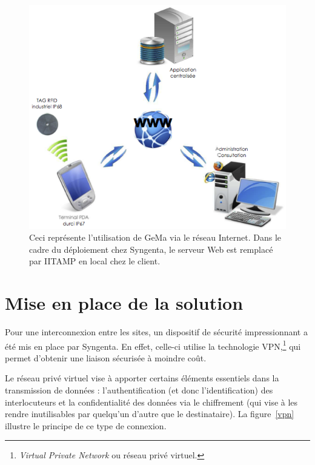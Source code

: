 \begin{figure}
  \begin{center}
    \includegraphics[scale=1.5]{images/gema.png}
    \caption{Ceci représente l'utilisation de GeMa via le réseau
    Internet. Dans le cadre du déploiement chez Syngenta, le serveur Web
    est remplacé par IITAMP en local chez le client.}
    \label{gema}
  \end{center}
\end{figure}

\section{Mise en place de la solution} %
\label{sec:Mise en place de la solution}

Pour une interconnexion entre les sites, un dispositif de sécurité
impressionnant a été mis en place par Syngenta. En effet, celle-ci
utilise la technologie VPN,\footnote{\emph{Virtual Private Network} ou
réseau privé virtuel.} qui permet d'obtenir une liaison sécurisée à
moindre coût.

Le réseau privé virtuel vise à apporter certains éléments essentiels
dans la transmission de données : l'authentification (et donc
l'identification) des interlocuteurs et la confidentialité des données
via le chiffrement (qui vise à les rendre inutilisables par quelqu'un
d'autre que le destinataire). La figure~\ref{vpn} illustre le principe
de ce type de connexion.

